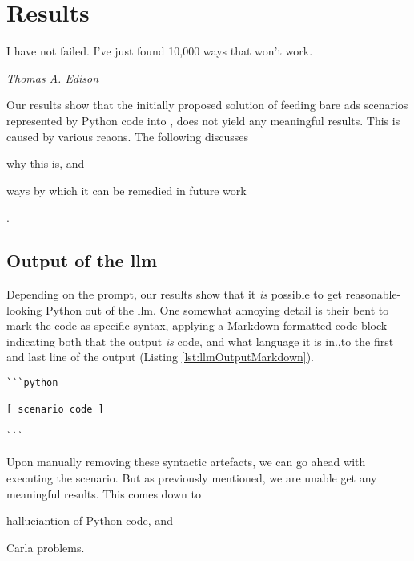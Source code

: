 \chapter{Results}\label{sec:results}

\epigraph{I have not failed. I've just found 10,000 ways that won't work.}{\textit{Thomas A. Edison}}

Our results show that the initially proposed solution of feeding bare
\acrshort{ads} scenarios represented by Python code into , does
not yield any meaningful results. This is caused by various reaons. The
following discusses \begin{inparaenum}
    \item why this is, and 
    \item ways by which it can be remedied in future work \end{inparaenum}.

\section{Output of the \acrshort{llm}}

Depending on the prompt, our results show that it \emph{is} possible to get
reasonable-looking Python out of the \acrshort{llm}. One somewhat annoying
detail is their bent to mark the code as specific syntax, applying a
Markdown-formatted code block indicating both that the output \emph{is} code,
and what language it is in.,to the first and last line of the output (Listing \ref{lst:llmOutputMarkdown}). 
\begin{lstlisting}[caption={\acrshort{llm}-generated Python code with Markdown syntax. The bracketed part on line 3 has been added for demonstration purposes.}, label={lst:llmOutputMarkdown}]
```python

[ scenario code ]

```
\end{lstlisting}



Upon manually removing these syntactic artefacts, we can go ahead with executing
the scenario. But as previously mentioned, we are unable get any meaningful
results. This comes down to \begin{inparaenum}
    \item halluciantion of Python code, and 
    \item Carla problems.
\end{inparaenum}

